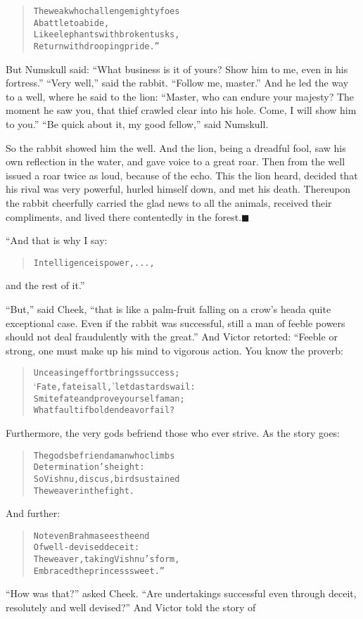 \documentclass[article, twoside, 14pt]{memoir}
\newcommand{\qed}{\hfill \ensuremath{\blacksquare}}
\renewenvironment{verbatim}{%
\begin{quote}%
\vskip -10pt%
\begin{alltt}\normalfont\large}{\end{alltt}%
\end{quote}%
\vskip -10pt
} %
\begin{document}
\begin{verbatim}
The weak who challenge mighty foes
    A battle to abide,
Like elephants with broken tusks,
    Return with drooping pride.”
\end{verbatim}
But Numskull said:
``What business is it of yours? Show him to me, even in his fortress.''
``Very well,'' said the rabbit. ``Follow me, master.'' And he led
the way to a well, where he said to the lion:
``Master, who can endure your majesty? The moment he saw you, that thief crawled clear into his hole. Come, I will show him to you.''
``Be quick about it, my good fellow,'' said Numskull.

So the rabbit showed him the well. And the lion, being a dreadful
fool, saw his own reflection in the water, and gave voice to a
great roar. Then from the well issued a roar twice as loud, because
of the echo. This the lion heard, decided that his rival was very
powerful, hurled himself down, and met his death. Thereupon the
rabbit cheerfully carried the glad news to all the animals,
received their compliments, and lived there contentedly in the
forest.\hyperref[s10]{\qed}

“And that is why I say:

\begin{verbatim}
Intelligence is power, ...,
\end{verbatim}
and the rest of it.”

``But,'' said Cheek,
``that is like a palm-fruit falling on a crow's head{\textemdash}a quite exceptional case. Even if the rabbit was successful, still a man of feeble powers should not deal fraudulently with the great.''
And Victor retorted: “Feeble or strong, one must make up his mind
to vigorous action. You know the proverb:

\begin{verbatim}
Unceasing effort brings success;
    ‘Fate, fate is all,’ let dastards wail:
Smite fate and prove yourself a man;
    What fault if bold endeavor fail?
\end{verbatim}
Furthermore, the very gods befriend those who ever strive. As the
story goes:

\begin{verbatim}
The gods befriend a man who climbs
    Determination's height:
So Vishnu, discus, bird sustained
    The weaver in the fight.
\end{verbatim}
And further:

\begin{verbatim}
Not even Brahma sees the end
    Of well-devised deceit:
The weaver, taking Vishnu's form,
    Embraced the princess sweet.”
\end{verbatim}
``How was that?'' asked Cheek.
``Are undertakings successful even through deceit, resolutely and well devised?''
And Victor told the story of
\end{document}
